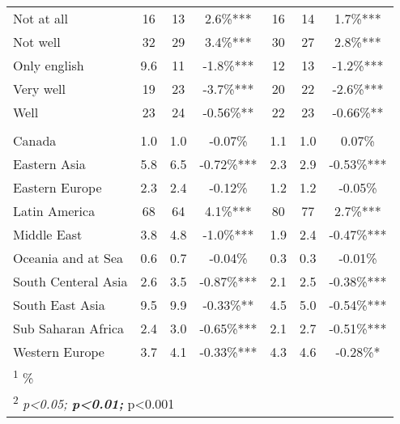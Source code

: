 \documentclass[
]{article}
\let\origtable\table
\let\endorigtable\endtable
\renewenvironment{table}[1][ht]{
      \expandafter\origtable\expandafter[H]
    }{
      \endorigtable
    }
\begin{document}
\begin{table}[H]
{\begin{tabular}[t]{lcccccc}
\hspace{1em}Not at all & 16 & 13 & 2.6\%*** & 16 & 14 & 1.7\%***\\
\hspace{1em}Not well & 32 & 29 & 3.4\%*** & 30 & 27 & 2.8\%***\\
\hspace{1em}Only english & 9.6 & 11 & -1.8\%*** & 12 & 13 & -1.2\%***\\
\hspace{1em}Very well & 19 & 23 & -3.7\%*** & 20 & 22 & -2.6\%***\\
\hspace{1em}Well & 23 & 24 & -0.56\%** & 22 & 23 & -0.66\%**\\
\addlinespace[0.3em]
\multicolumn{7}{l}{\textbf{Country/Region of birth, \%}}\\
\hspace{1em}Canada & 1.0 & 1.0 & -0.07\% & 1.1 & 1.0 & 0.07\%\\
\hspace{1em}Eastern Asia & 5.8 & 6.5 & -0.72\%*** & 2.3 & 2.9 & -0.53\%***\\
\hspace{1em}Eastern Europe & 2.3 & 2.4 & -0.12\% & 1.2 & 1.2 & -0.05\%\\
\hspace{1em}Latin America & 68 & 64 & 4.1\%*** & 80 & 77 & 2.7\%***\\
\hspace{1em}Middle East & 3.8 & 4.8 & -1.0\%*** & 1.9 & 2.4 & -0.47\%***\\
\hspace{1em}Oceania and at Sea & 0.6 & 0.7 & -0.04\% & 0.3 & 0.3 & -0.01\%\\
\hspace{1em}South Centeral Asia & 2.6 & 3.5 & -0.87\%*** & 2.1 & 2.5 & -0.38\%***\\
\hspace{1em}South East Asia & 9.5 & 9.9 & -0.33\%** & 4.5 & 5.0 & -0.54\%***\\
\hspace{1em}Sub Saharan Africa & 2.4 & 3.0 & -0.65\%*** & 2.1 & 2.7 & -0.51\%***\\
\hspace{1em}Western Europe & 3.7 & 4.1 & -0.33\%*** & 4.3 & 4.6 & -0.28\%*\\
\bottomrule
\multicolumn{7}{l}{\rule{0pt}{1em}\textsuperscript{1} \%}\\
\multicolumn{7}{l}{\rule{0pt}{1em}\textsuperscript{2} \textit{p<0.05; \textbf{p<0.01; }}p<0.001}\\
\end{tabular}}
\end{table}
\end{document}
